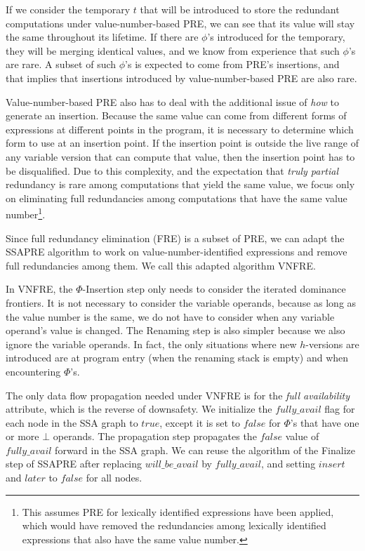 If we consider the temporary $t$ that will be introduced to store the redundant
computations under value-number-based PRE, we can see that its value will
stay the same throughout its lifetime.  If there are $\phi$'s introduced for
the temporary, they will be merging identical values, and we know from
experience that such $\phi$'s are rare.  A subset of such $\phi$'s is expected 
to come from PRE's insertions, and that implies that insertions
introduced by value-number-based PRE are also rare.

Value-number-based PRE also has to deal with the additional issue of \emph{how}
to generate an insertion.  Because the same value can come from different forms
of expressions at different points in the program, it is necessary to determine
which form to use at an insertion point.  If the insertion point is outside 
the live range of any variable version that can compute that value, then the
insertion point has to be disqualified.  Due to this complexity, and the
expectation that \emph{truly partial} redundancy is rare among computations
that yield the same value, we focus only on eliminating full redundancies
among computations that have the same value number\footnote{This assumes
PRE for lexically identified expressions have been applied, which would have
removed the redundancies among lexically identified expressions that also
have the same value number.}.

Since full redundancy elimination (FRE) is a subset of PRE, we can adapt the
SSAPRE algorithm to work on value-number-identified expressions and remove
full redundancies among them.  We call this adapted algorithm VNFRE.

In VNFRE, the $\Phi$-Insertion step only needs to consider the iterated
dominance frontiers.  It is not necessary to consider the variable operands,
because as long as the value number is the same, we do not have to consider
when any variable operand's value is changed. The Renaming step is also simpler
because we also ignore the variable operands.  In fact, the only situations 
where new $h$-versions are introduced are at program entry (when the renaming 
stack is empty) and when encountering $\Phi$'s.

The only data flow propagation needed under VNFRE is for the \emph{full 
availability}
attribute, which is the reverse of downsafety.  We initialize the $fully\_avail$
flag for each node in the SSA graph to $true$, except it is set to $false$ for
$\Phi$'s that have one or more $\bot$ operands.  The propagation step
propagates the $false$ value of $fully\_avail$ forward in the SSA graph.
We can reuse the algorithm of the Finalize step of SSAPRE after replacing 
$will\_be\_avail$ by $fully\_avail$, and setting $insert$ and
$later$ to $false$ for all nodes.

